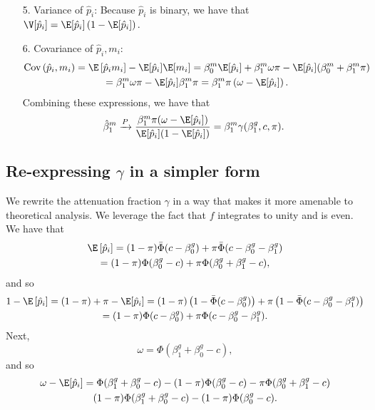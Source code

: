 \documentclass[12pt]{article}
\begin{document}
\begin{appendices}
\begin{itemize}
\begin{multline*}
\end{multline*}
\item[5.] Variance of $\hat{p}_i$: Because $\hat{p}_i$ is binary, we have that $\V[\hat{p}_i] = \E[\hat{p}_i]\left(1 - \E[\hat{p}_i]\right) .$
\item[6.] Covariance of $\hat{p}_i, m_i$:
\begin{multline*}
\textrm{Cov}\left(\hat{p}_i, m_i\right) = \E\left[\hat{p}_i m_i\right] - \E[\hat{p}_i] \E[m_i] = \beta^m_0 \E[\hat{p}_i] + \beta^m_1 \omega \pi - \E[\hat{p}_i]( \beta^m_0 + \beta^m_1 \pi)\\ = \beta^m_1 \omega \pi - \E[\hat{p}_i] \beta_1^m \pi = \beta^m_1 \pi \left( \omega - \E[\hat{p}_i]\right).
\end{multline*}
Combining these expressions, we have that
$$ \hat{\beta}^m_1 \xrightarrow{P} \frac{\beta^m_1 \pi (\omega - \E[\hat{p}_i])}{\E[\hat{p}_i](1 - \E[\hat{p}_i])} = \beta^m_1 \gamma(\beta^g_1, c, \pi).$$
\end{itemize}

\subsection{Re-expressing $\gamma$ in a simpler form}\label{sec:simplication}
We rewrite the attenuation fraction $\gamma$ in a way that makes it more amenable to theoretical analysis. We leverage the fact that $f$ integrates to unity and is even. We have that
\begin{multline}\label{thm:gamma_expression_1} \E\left[\hat{p}_i\right] = (1 - \pi) \bar{\Phi}(c - \beta_0^g) + \pi \bar{\Phi}(c - \beta^g_0 - \beta^g_1) \\ = (1 - \pi) \Phi(\beta_0^g - c) + \pi\Phi(\beta^g_0 + \beta^g_1 - c), \end{multline}
 and so \begin{multline}\label{thm:gamma_expression_2} 1 - \E\left[\hat{p}_i\right] = (1 - \pi) + \pi - \E[\hat{p}_i]  = (1-\pi) \left(1 - \bar{\Phi}(c - \beta_0^g)\right)  + \pi \left(1 - \bar{\Phi}(c - \beta^g_0 - \beta^g_1) \right) \\ = (1 - \pi)\Phi(c - \beta^g_0) + \pi \Phi(c - \beta_0^g - \beta_1^g).
\end{multline}
Next,
\begin{equation}\label{thm:gamma_expression_3}
\omega = \Phi(\beta^g_1 + \beta^g_0 - c),\end{equation} and so
\begin{multline}\label{thm:gamma_expression_4}
\omega - \E[\hat{p}_i] = \Phi(\beta^g_1 + \beta^g_0 - c) - (1-\pi)\Phi(\beta^g_0 - c) - \pi \Phi(\beta^g_0 + \beta^g_1 - c)  \\ (1-\pi)\Phi(\beta^g_1 + \beta^g_0 - c)  - (1-\pi)\Phi(\beta^g_0 - c).
\end{multline}


\end{appendices}
\end{document}
